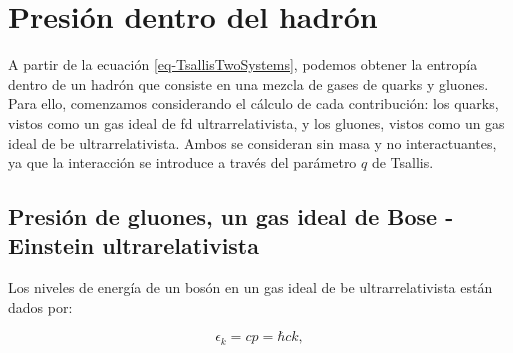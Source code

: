 

    
    

\section{Presión dentro del hadrón}\label{sec-PresTsa}

A partir de la ecuación \eqref{eq-TsallisTwoSystems}, podemos obtener la entropía dentro de un hadrón que consiste en una mezcla de gases de quarks y gluones. Para ello, comenzamos considerando el cálculo de cada contribución: los quarks, vistos como un gas ideal de \acrfull{fd} ultrarrelativista, y los gluones, vistos como un gas ideal de \acrfull{be} ultrarrelativista. Ambos se consideran sin masa y no interactuantes, ya que la interacción se introduce a través del parámetro \( q \) de Tsallis.

\subsection{Presión de gluones, un gas ideal de Bose - Einstein ultrarelativista}

Los niveles de energía de un bosón en un gas ideal de \acrshort{be} ultrarrelativista están dados por:

\begin{equation}
{\epsilon}_{k} = cp = \hbar c k,
\end{equation}


